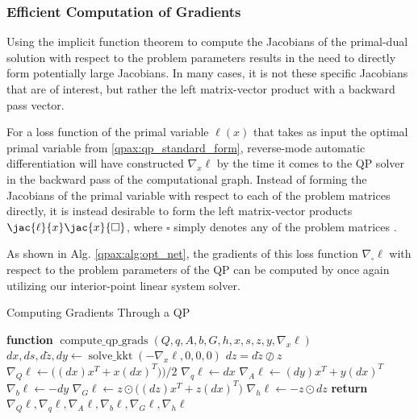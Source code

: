 \subsubsection{Efficient Computation of Gradients}
Using the implicit function theorem to compute the Jacobians of the primal-dual solution with respect to the problem parameters results in the need to directly form potentially large Jacobians. In many cases, it is not these specific Jacobians that are of interest, but rather the left matrix-vector product with a backward pass vector.

For a loss function of the primal variable $\ell(x)$ that takes as input the optimal primal variable from \eqref{qpax:qp_standard_form}, reverse-mode automatic differentiation will have constructed $\nabla_x \ell$ by the time it comes to the QP solver in the backward pass of the computational graph. Instead of forming the Jacobians of the primal variable with respect to each of the problem matrices directly, it is instead desirable to form the 
left matrix-vector products $\jac{\ell}{x} \jac{x}{\square}$,
where $\square$ simply denotes any of the problem matrices \cite{amos2017}.

As shown in Alg. \eqref{qpax:alg:opt_net}, the gradients of this loss function $\nabla_\square \ell$ with respect to the problem parameters of the QP can be computed by once again utilizing our interior-point linear system solver.
\begin{algorithm} 
\begin{algorithmic}[1]
    \caption{Computing Gradients Through a QP}\label{qpax:alg:opt_net}
        \State \textbf{function} $\operatorname{compute\_qp\_grads}(Q, q, A, b, G, h, x, s, z, y, \nabla_x \ell)$ %
        \State $dx, ds, d\tilde{z}, dy \gets \operatorname{solve\_kkt}(-\nabla_x \ell, 0, 0, 0)$ 
        \State $dz = d\tilde{z} \oslash z$ 
        \State $\nabla_Q \ell \gets \big((dx) x^T + x (dx)^T)\big)/2$
        \State $\nabla_q \ell \gets dx$
        \State $\nabla_A \ell \gets (dy)x^T + y (dx)^T$ 
        \State $\nabla_b \ell \gets -dy$
        \State $\nabla_G \ell \gets z \odot \big((dz)x^T + z(dx)^T\big)$
        \State $\nabla_h \ell \gets -z \odot dz$
    \State \textbf{return} $\nabla_Q \ell, \nabla_q \ell, \nabla_A \ell, \nabla_b \ell, \nabla_G \ell, \nabla_h \ell$ 
\end{algorithmic}
\end{algorithm}
%
%
%
%
%
%
